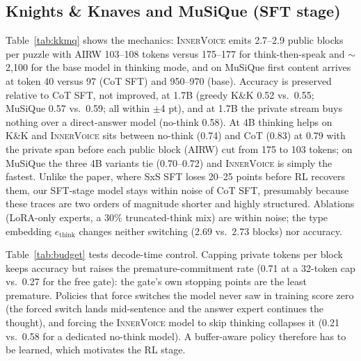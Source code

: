 \documentclass[letterpaper]{article} %
\newcommand{\iv}{\textsc{InnerVoice}}
\begin{document}
\subsection{Knights \& Knaves and MuSiQue (SFT stage)}

Table~\ref{tab:kkmq} shows the mechanics: \iv{} emits 2.7--2.9 public blocks per puzzle with AIRW 103--108 tokens versus 175--177 for think-then-speak and $\sim$2,100 for the base model in thinking mode, and on MuSiQue first content arrives at token 40 versus 97 (CoT SFT) and 950--970 (base). Accuracy is preserved relative to CoT SFT, not improved, at 1.7B (greedy K\&K 0.52 vs.\ 0.55; MuSiQue 0.57 vs.\ 0.59; all within $\pm$4 pt), and at 1.7B the private stream buys nothing over a direct-answer model (no-think 0.58). At 4B thinking helps on K\&K and \iv{} sits between no-think (0.74) and CoT (0.83) at 0.79 with the private span before each public block (AIRW) cut from 175 to 103 tokens; on MuSiQue the three 4B variants tie (0.70--0.72) and \iv{} is simply the fastest. Unlike the paper, where SxS SFT loses 20--25 points before RL recovers them, our SFT-stage model stays within noise of CoT SFT, presumably because these traces are two orders of magnitude shorter and highly structured. Ablations (LoRA-only experts, a 30\% truncated-think mix) are within noise; the type embedding $e_{\text{think}}$ changes neither switching (2.69 vs.\ 2.73 blocks) nor accuracy.


Table~\ref{tab:budget} tests decode-time control. Capping private tokens per block keeps accuracy but raises the premature-commitment rate (0.71 at a 32-token cap vs.\ 0.27 for the free gate): the gate's own stopping points are the least premature. Policies that force switches the model never saw in training score zero (the forced switch lands mid-sentence and the answer expert continues the thought), and forcing the \iv{} model to skip thinking collapses it (0.21 vs.\ 0.58 for a dedicated no-think model). A buffer-aware policy therefore has to be learned, which motivates the RL stage.
\end{document}
